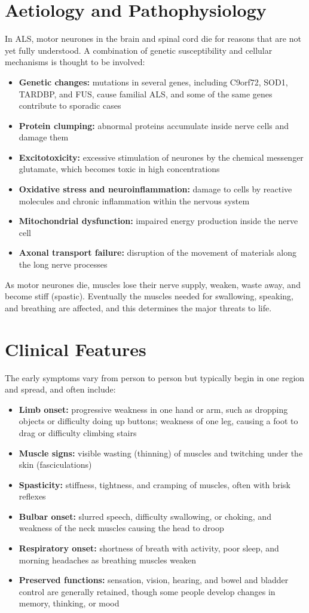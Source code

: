 \section*{Aetiology and Pathophysiology}
In ALS, motor neurones in the brain and spinal cord die for reasons that are not yet fully understood. A combination of genetic susceptibility and cellular mechanisms is thought to be involved:
\begin{itemize}
    \item \textbf{Genetic changes:} mutations in several genes, including C9orf72, SOD1, TARDBP, and FUS, cause familial ALS, and some of the same genes contribute to sporadic cases
    \item \textbf{Protein clumping:} abnormal proteins accumulate inside nerve cells and damage them
    \item \textbf{Excitotoxicity:} excessive stimulation of neurones by the chemical messenger glutamate, which becomes toxic in high concentrations
    \item \textbf{Oxidative stress and neuroinflammation:} damage to cells by reactive molecules and chronic inflammation within the nervous system
    \item \textbf{Mitochondrial dysfunction:} impaired energy production inside the nerve cell
    \item \textbf{Axonal transport failure:} disruption of the movement of materials along the long nerve processes
\end{itemize}
As motor neurones die, muscles lose their nerve supply, weaken, waste away, and become stiff (spastic). Eventually the muscles needed for swallowing, speaking, and breathing are affected, and this determines the major threats to life.

\section*{Clinical Features}
The early symptoms vary from person to person but typically begin in one region and spread, and often include:
\begin{itemize}
    \item \textbf{Limb onset:} progressive weakness in one hand or arm, such as dropping objects or difficulty doing up buttons; weakness of one leg, causing a foot to drag or difficulty climbing stairs
    \item \textbf{Muscle signs:} visible wasting (thinning) of muscles and twitching under the skin (fasciculations)
    \item \textbf{Spasticity:} stiffness, tightness, and cramping of muscles, often with brisk reflexes
    \item \textbf{Bulbar onset:} slurred speech, difficulty swallowing, or choking, and weakness of the neck muscles causing the head to droop
    \item \textbf{Respiratory onset:} shortness of breath with activity, poor sleep, and morning headaches as breathing muscles weaken
    \item \textbf{Preserved functions:} sensation, vision, hearing, and bowel and bladder control are generally retained, though some people develop changes in memory, thinking, or mood
\end{itemize}

